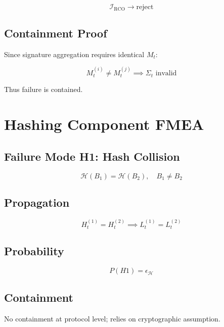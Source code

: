 \begin{equation}
\mathcal{I}_{\text{RCO}} \rightarrow \text{reject}
\end{equation}

\subsection{Containment Proof}

Since signature aggregation requires identical $M_t$:

\begin{equation}
M_t^{(i)} \neq M_t^{(j)} \implies \Sigma_t \text{ invalid}
\end{equation}

Thus failure is contained.

\section{Hashing Component FMEA}

\subsection{Failure Mode H1: Hash Collision}

\begin{equation}
\mathcal{H}(B_1) = \mathcal{H}(B_2), \quad B_1 \neq B_2
\end{equation}

\subsection{Propagation}

\begin{equation}
H_t^{(1)} = H_t^{(2)} \implies L_t^{(1)} = L_t^{(2)}
\end{equation}

\subsection{Probability}

\begin{equation}
P(H1) = \epsilon_{\mathcal{H}}
\end{equation}

\subsection{Containment}

No containment at protocol level; relies on cryptographic assumption.

